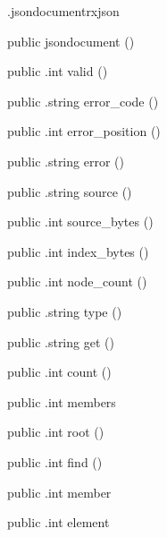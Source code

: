 \begin{CrexxClass}{.jsondocument}{rxjson}

  \begin{Hierarchy}
  \end{Hierarchy}

  \begin{Members}

    \Factory
      {public}
      {jsondocument}
      {()}

    \Method
      {public}
      {.int}
      {valid}
      {()}

    \Method
      {public}
      {.string}
      {error\_code}
      {()}

    \Method
      {public}
      {.int}
      {error\_position}
      {()}

    \Method
      {public}
      {.string}
      {error}
      {()}

    \Method
      {public}
      {.string}
      {source}
      {()}

    \Method
      {public}
      {.int}
      {source\_bytes}
      {()}

    \Method
      {public}
      {.int}
      {index\_bytes}
      {()}

    \Method
      {public}
      {.int}
      {node\_count}
      {()}

    \Method
      {public}
      {.string}
      {type}
      {()}

    \Method
      {public}
      {.string}
      {get}
      {()}

    \Method
      {public}
      {.int}
      {count}
      {()}

    \Method
      {public}
      {.int}
      {members}
      {}

    \Method
      {public}
      {.int}
      {root}
      {()}

    \Method
      {public}
      {.int}
      {find}
      {()}

    \Method
      {public}
      {.int}
      {member}
      {}

    \Method
      {public}
      {.int}
      {element}
      {}


\end{Members}
\end{CrexxClass}
